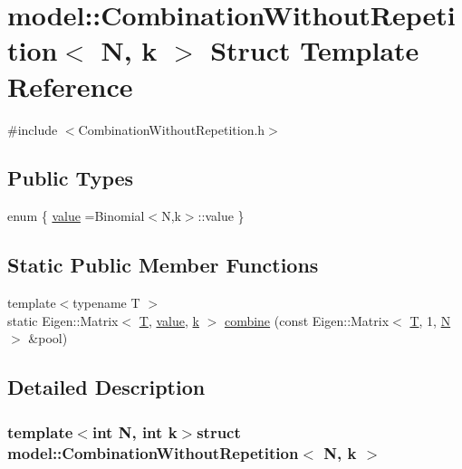 \hypertarget{structmodel_1_1_combination_without_repetition}{}\section{model\+:\+:Combination\+Without\+Repetition$<$ N, k $>$ Struct Template Reference}
\label{structmodel_1_1_combination_without_repetition}


{\ttfamily \#include $<$Combination\+Without\+Repetition.\+h$>$}

\subsection*{Public Types}
\begin{DoxyCompactItemize}
\item 
enum \{ \hyperlink{structmodel_1_1_combination_without_repetition_ad193fd879d424233f86d62ce25775207a73e92f4f1fc7e0071cda6ef63024e6d4}{value} =Binomial$<$N,k$>$\+:\+:value
 \}
\end{DoxyCompactItemize}
\subsection*{Static Public Member Functions}
\begin{DoxyCompactItemize}
\item 
{\footnotesize template$<$typename T $>$ }\\static Eigen\+::\+Matrix$<$ \hyperlink{_spline_node_base__corder1_8h_a82692d3a5502b91460591f1d5504314a}{T}, \hyperlink{structmodel_1_1_combination_without_repetition_ad193fd879d424233f86d62ce25775207a73e92f4f1fc7e0071cda6ef63024e6d4}{value}, \hyperlink{_f_e_m_2linear__elasticity__3d_2tetgen_2generate_p_o_l_ycube_8m_a5d2aad4440da75aa43f2643e72b1a3bd}{k} $>$ \hyperlink{structmodel_1_1_combination_without_repetition_a117ca315f9f91486a79984a0d1b80f37}{combine} (const Eigen\+::\+Matrix$<$ \hyperlink{_spline_node_base__corder1_8h_a82692d3a5502b91460591f1d5504314a}{T}, 1, \hyperlink{thompson__tetrahedron_8m_a7823765a845eb81829f110d8337f81ae}{N} $>$ \&pool)
\end{DoxyCompactItemize}


\subsection{Detailed Description}
\subsubsection*{template$<$int N, int k$>$struct model\+::\+Combination\+Without\+Repetition$<$ N, k $>$}

